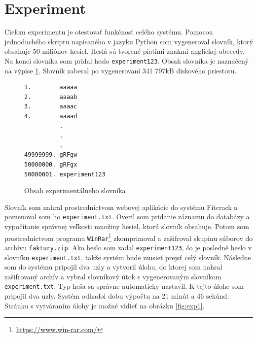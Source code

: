 \documentclass[slovak]{fitthesis}
\begin{document}
\section{Experiment}
Cieľom experimentu je otestovať funkčnosť celého systému. Pomocou jednoduchého skriptu napísaného v jazyku Python som vygeneroval slovník, ktorý obsahuje 50 miliónov hesiel. Heslá sú tvorené piatimi znakmi anglickej abecedy. Na konci slovníka som pridal heslo \texttt{experiment123}. Obsah slovníka je naznačený na výpise \ref{lst:experimentDict}. Slovník zaberal po vygenerovaní 341 797kB diskového priestoru.
\begin{figure}[H]
\begin{center}
\begin{varwidth}{\linewidth}
\begin{verbatim}
1.        aaaaa
2.        aaaab
3.        aaaac
4.        aaaad
          .
          .
          .
49999999. gRFgw
50000000. gRFgx
50000001. experiment123
\end{verbatim}
\end{varwidth}
\end{center}
\caption{Obsah experimentálneho slovníka}
\label{lst:experimentDict}
\end{figure}
Slovník som nahral prostredníctvom webovej aplikácie do systému Fitcrack a pomenoval som ho \texttt{experiment.txt}. Overil som pridanie záznamu do databázy a vypočítanie správnej veľkosti množiny hesiel, ktorú slovník obsahuje. Potom som prostredníctvom programu \texttt{WinRar}\footnote{\url{https://www.win-rar.com/}} zkomprimoval a zašifroval skupinu súborov do archívu \texttt{faktury.zip}. Ako heslo som zadal \texttt{experiment123}, čo je posledné heslo v slovníku \texttt{experiment.txt}, takže systém bude musieť prejsť celý slovník. Následne som do systému pripojil dva uzly a vytvoril úlohu, do ktorej som nahral zašifrovaný archív a vybral slovníkový útok s vygenerovaným slovníkom \texttt{experiment.txt}. Typ heša sa správne automaticky nastavil. K tejto úlohe som pripojil dva uzly. Systém odhadol dobu výpočtu na 21 minút a 46 sekúnd. Stránku s vytváraním úlohy je možné vidieť na obrázku \ref{fig:exp1}. 
\end{document}
